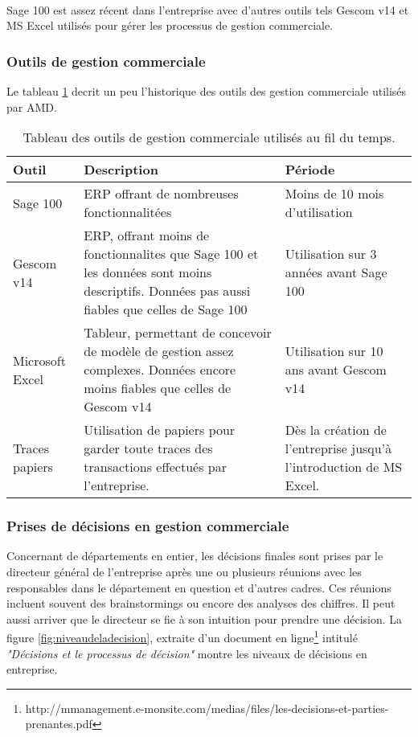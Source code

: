  \paragraph{}
 Sage 100 est assez récent dans l’entreprise avec d’autres outils tels Gescom v14 et MS Excel utilisés pour gérer les processus de gestion commerciale. 
 
 \subsubsection{Outils de gestion commerciale}
 Le tableau \ref{tab:outilsdegescom} decrit un peu l'historique des outils des gestion commerciale utilisés par AMD.
 
 \begin{table}[H]
     \centering
     \caption{Tableau des outils de gestion commerciale utilisés au fil du temps.}
     \begin{tabular}[t]{|p{3cm}|p{7cm}|p{5cm}|} 
         \hline
         \textbf{Outil} & \textbf{Description} & \textbf{Période} \\
         \hline\hline
         Sage 100 & ERP offrant de nombreuses fonctionnalitées & Moins de 10 mois d'utilisation \\
         \hline
         Gescom v14 & ERP, offrant moins de fonctionnalites que Sage 100 et les données sont moins descriptifs. Données pas aussi  fiables que celles de Sage 100  & Utilisation sur 3 années avant Sage 100 \\ 
         \hline
         Microsoft Excel & Tableur, permettant de concevoir de modèle de gestion assez complexes. Données encore moins fiables que celles de Gescom v14 & Utilisation sur 10 ans avant Gescom v14 \\ 
         \hline
         Traces papiers & Utilisation de papiers pour garder toute traces des transactions effectués par l’entreprise. & Dès la création de l’entreprise jusqu’à l’introduction de MS Excel. \\ 
         \hline\hline
     \end{tabular}
     \label{tab:outilsdegescom}
 \end{table}%
 
 \subsubsection{Prises de décisions en gestion commerciale}
 Concernant de départements en entier, les décisions finales sont prises par le directeur général de l’entreprise après une ou plusieurs réunions avec les responsables dans le département en question et d’autres cadres. Ces réunions incluent souvent des brainstormings ou encore des analyses des chiffres. Il peut aussi arriver que le directeur se fie à son intuition pour prendre une décision. La figure \ref{fig:niveaudeladecision}, extraite d'un document en ligne\footnote{http://mmanagement.e-monsite.com/medias/files/les-decisions-et-parties-prenantes.pdf} intitulé \textit{"Décisions et le processus de décision"} montre les niveaux de décisions en entreprise.
 
